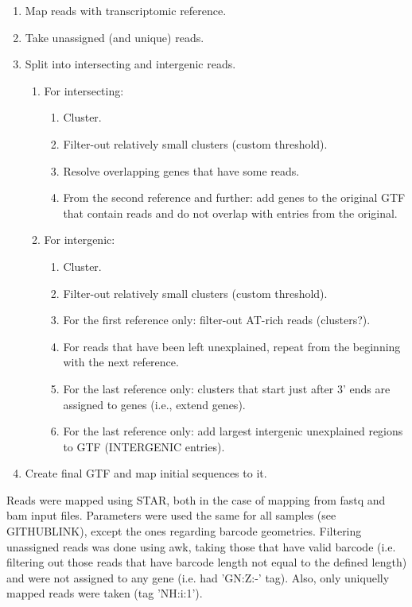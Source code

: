 \begin{enumerate}
    \item Map reads with transcriptomic reference.
    \item Take unassigned (and unique) reads.
    \item Split into intersecting and intergenic reads.
    \begin{enumerate}
        \item For intersecting:
        \begin{enumerate}
            \item Cluster.
            \item Filter-out relatively small clusters (custom threshold).
            \item Resolve overlapping genes that have some reads.
            \item From the second reference and further: add genes to the original GTF that contain reads and do not overlap with entries from the original.
        \end{enumerate}
        \item For intergenic:
        \begin{enumerate}
            \item Cluster.
            \item Filter-out relatively small clusters (custom threshold).
            \item For the first reference only: filter-out AT-rich reads (clusters?).
            \item For reads that have been left unexplained, repeat from the beginning with the next reference.
            \item For the last reference only: clusters that start just after 3' ends are assigned to genes (i.e., extend genes).
            \item For the last reference only: add largest intergenic unexplained regions to GTF (INTERGENIC entries).
        \end{enumerate}
    \end{enumerate}
    \item Create final GTF and map initial sequences to it.
\end{enumerate}

Reads were mapped using STAR, both in the case of mapping from fastq and bam input files.
Parameters were used the same for all samples (see GITHUBLINK), except the ones regarding barcode geometries.
Filtering unassigned reads was done using awk, taking those that have valid barcode
(i.e. filtering out those reads that have barcode length not equal to the defined length)
and were not assigned to any gene (i.e. had 'GN:Z:-' tag).
Also, only uniquelly mapped reads were taken (tag 'NH:i:1').

